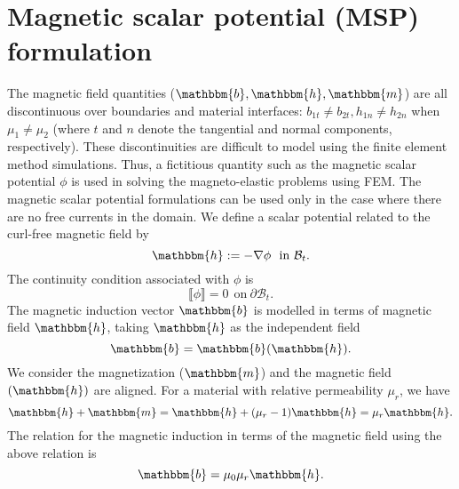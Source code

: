 \section{Magnetic scalar potential (MSP) formulation}
The magnetic field quantities ($\mathbbm{b}, \mathbbm{h}, \mathbbm{m}$) are all discontinuous over boundaries and material interfaces: $b_{1t} \neq b_{2t}, h_{1n} \neq h_{2n}$ when $\mu_1 \neq \mu_2$ (where $t$ and $n$ denote the tangential and normal components, respectively). These discontinuities are difficult to model using the finite element method simulations. Thus, a fictitious quantity such as the magnetic scalar potential $\phi$ is used in solving the magneto-elastic problems using FEM. The magnetic scalar potential formulations can be used only in the case where there are no free currents in the domain. We define a scalar potential related to the curl-free magnetic field by \cite{pelteret2016}
\begin{equation}
\mathbbm{h} := -\nabla \phi \ \ \text{in} \ \mathcal{B}_t. 
\label{eq:1.5}
\end{equation}
The continuity condition associated with $\phi$ is 
\begin{equation}
\llbracket \phi \rrbracket = 0 \ \ \text{on} \ \partial\mathcal{B}_t.
\end{equation}
The magnetic induction vector $\mathbbm{b}$ is modelled in terms of magnetic field $\mathbbm{h}$, taking $\mathbbm{h}$ as the independent field
\begin{equation}
\mathbbm{b} = \mathbbm{b}(\mathbbm{h}).
\end{equation}
We consider the magnetization ($\mathbbm{m}$) and the magnetic field $(\mathbbm{h})$ are aligned. For a material with relative permeability $\mu_r$, we have
\begin{equation}
\mathbbm{h} + \mathbbm{m} = \mathbbm{h} + (\mu_r - 1)\mathbbm{h} = \mu_r \mathbbm{h}.
\end{equation}
The relation for the magnetic induction in terms of the magnetic field using the above relation is
\begin{equation}
\mathbbm{b} = \mu_0 \mu_r \mathbbm{h}.
\label{eq:1.7}
\end{equation}

